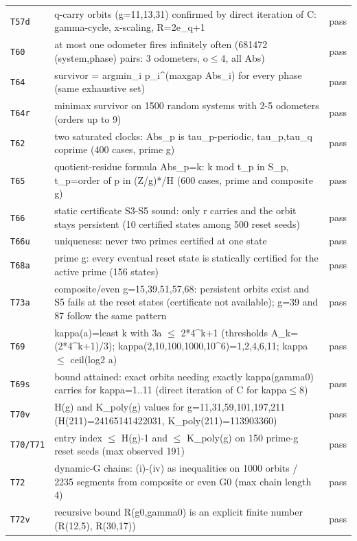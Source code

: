 \begin{longtable}{@{}p{13mm}p{100mm}p{11mm}@{}}
\texttt{T57d} & q-carry orbits (g=11,13,31) confirmed by direct iteration of C: gamma-cycle, x-scaling, R=2e\_q+1 & pass \\
\texttt{T60} & at most one odometer fires infinitely often (681472 (system,phase) pairs: 3 odometers, o$\leq$4, all Abs) & pass \\
\texttt{T64} & survivor = argmin\_i p\_i\^{}(maxgap Abs\_i) for every phase (same exhaustive set) & pass \\
\texttt{T64r} & minimax survivor on 1500 random systems with 2-5 odometers (orders up to 9) & pass \\
\texttt{T62} & two saturated clocks: Abs\_p is tau\_p-periodic, tau\_p,tau\_q coprime (400 cases, prime g) & pass \\
\texttt{T65} & quotient-residue formula Abs\_p={k: k mod t\_p in S\_p}, t\_p=order of p in (Z/g)*/H (600 cases, prime and composite g) & pass \\
\texttt{T66} & static certificate S3-S5 sound: only r carries and the orbit stays persistent (10 certified states among 500 reset seeds) & pass \\
\texttt{T66u} & uniqueness: never two primes certified at one state & pass \\
\texttt{T68a} & prime g: every eventual reset state is statically certified for the active prime (156 states) & pass \\
\texttt{T73a} & composite/even g=15,39,51,57,68: persistent orbits exist and S5 fails at the reset states (certificate not available); g=39 and 87 follow the same pattern & pass \\
\texttt{T69} & kappa(a)=least k with 3a $\leq$ 2*4\^{}k+1 (thresholds A\_k=(2*4\^{}k+1)/3); kappa(2,10,100,1000,10\^{}6)=1,2,4,6,11; kappa $\leq$ ceil(log2 a) & pass \\
\texttt{T69s} & bound attained: exact orbits needing exactly kappa(gamma0) carries for kappa=1..11 (direct iteration of C for kappa$\leq$8) & pass \\
\texttt{T70v} & H(g) and K\_poly(g) values for g=11,31,59,101,197,211 (H(211)=24165141422031, K\_poly(211)=113903360) & pass \\
\texttt{T70/T71} & entry index $\leq$ H(g)-1 and $\leq$ K\_poly(g) on 150 prime-g reset seeds (max observed 191) & pass \\
\texttt{T72} & dynamic-G chains: (i)-(iv) as inequalities on 1000 orbits / 2235 segments from composite or even G0 (max chain length 4) & pass \\
\texttt{T72v} & recursive bound R(g0,gamma0) is an explicit finite number (R(12,5), R(30,17)) & pass \\
\bottomrule
\end{longtable}
\normalsize
